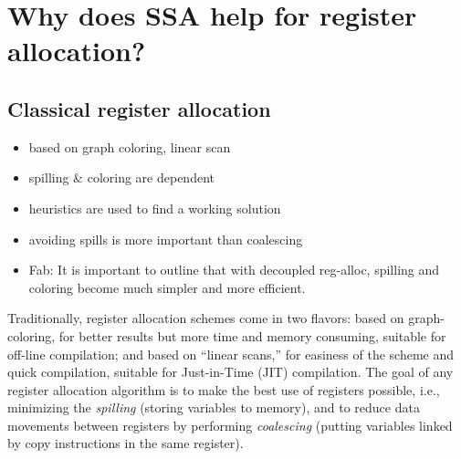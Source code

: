 {


\section{Why does SSA help for register allocation?}


\subsection{Classical register allocation}

{\sl
\begin{itemize}
  \item based on graph coloring, linear scan
  \item spilling \& coloring are dependent
  \item heuristics are used to find a working solution
  \item avoiding spills is more important than coalescing
  \item Fab: It is important to outline that with decoupled reg-alloc, spilling and coloring become much simpler and more efficient.
\end{itemize}
}

Traditionally, register allocation schemes come in two flavors: based on 
graph-coloring, for better results but more time and memory consuming, suitable 
for off-line compilation; and based on ``linear scans,'' for easiness of the 
scheme and quick compilation, suitable for Just-in-Time (JIT) compilation.  The 
goal of any register allocation algorithm is to make the best use of registers 
possible, i.e., minimizing the \emph{spilling} (storing variables to memory), and to 
reduce data movements between registers by performing \emph{coalescing} (putting 
variables linked by copy instructions in the same register).

}
